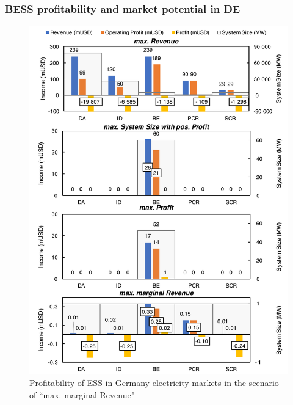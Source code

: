 



\subsubsection{BESS profitability and market potential in DE}

\begin{figure}[h!]
	\centering
	\includegraphics[width=0.9\linewidth]{Figures/Germany_ESS}
	\caption{Profitability of ESS in Germany electricity markets in the scenario of ``max. marginal Revenue"}
	\label{fig:germany-ess-profitability}
\end{figure}


